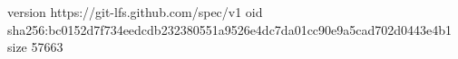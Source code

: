 version https://git-lfs.github.com/spec/v1
oid sha256:bc0152d7f734eedcdb232380551a9526e4dc7da01cc90e9a5cad702d0443e4b1
size 57663
